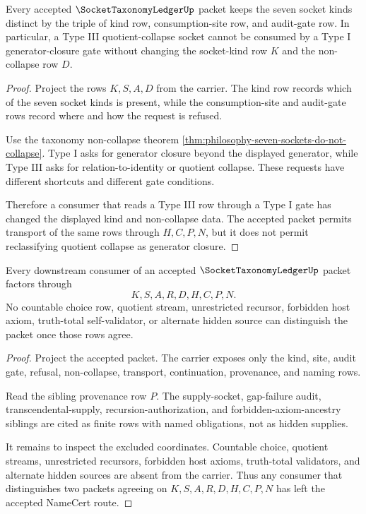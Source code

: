 \begin{theorem}
\label{thm:socket-taxonomy-ledger-non-collapse}
Every accepted $\SocketTaxonomyLedgerUp$ packet keeps the seven socket kinds distinct by the triple of kind row, consumption-site row, and audit-gate row. In particular, a Type III quotient-collapse socket cannot be consumed by a Type I generator-closure gate without changing the socket-kind row $K$ and the non-collapse row $D$.
\end{theorem}
\begin{proof}
Project the rows $K,S,A,D$ from the carrier. The kind row records which of the seven socket kinds is present, while the consumption-site and audit-gate rows record where and how the request is refused.

Use the taxonomy non-collapse theorem \autoref{thm:philosophy-seven-sockets-do-not-collapse}. Type I asks for generator closure beyond the displayed generator, while Type III asks for relation-to-identity or quotient collapse. These requests have different shortcuts and different gate conditions.

Therefore a consumer that reads a Type III row through a Type I gate has changed the displayed kind and non-collapse data. The accepted packet permits transport of the same rows through $H,C,P,N$, but it does not permit reclassifying quotient collapse as generator closure.
\end{proof}

\begin{theorem}
\label{thm:socket-taxonomy-ledger-audit-gate-nonescape}
Every downstream consumer of an accepted $\SocketTaxonomyLedgerUp$ packet factors through
$$
K,S,A,R,D,H,C,P,N.
$$
No countable choice row, quotient stream, unrestricted recursor, forbidden host axiom, truth-total self-validator, or alternate hidden source can distinguish the packet once those rows agree.
\end{theorem}
\begin{proof}
Project the accepted packet. The carrier exposes only the kind, site, audit gate, refusal, non-collapse, transport, continuation, provenance, and naming rows.

Read the sibling provenance row $P$. The supply-socket, gap-failure audit, transcendental-supply, recursion-authorization, and forbidden-axiom-ancestry siblings are cited as finite rows with named obligations, not as hidden supplies.

It remains to inspect the excluded coordinates. Countable choice, quotient streams, unrestricted recursors, forbidden host axioms, truth-total validators, and alternate hidden sources are absent from the carrier. Thus any consumer that distinguishes two packets agreeing on $K,S,A,R,D,H,C,P,N$ has left the accepted NameCert route.
\end{proof}

